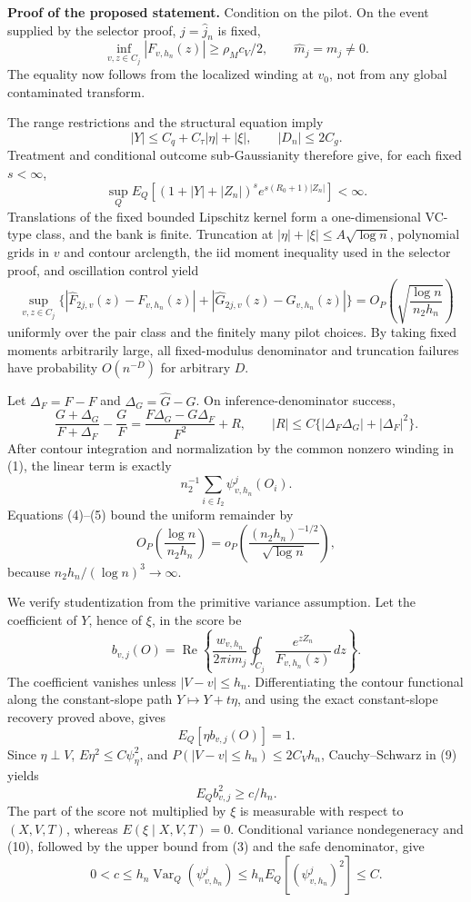 \textbf{Proof of the proposed statement.}
Condition on the pilot. On the event supplied by the selector proof, \(j=\widehat j_n\) is fixed,
\[
 \inf_{v,z\in C_j}|F_{v,h_n}(z)|\ge\rho_Mc_V/2,
 \qquad \widehat m_j=m_j\ne0. \tag{1}
\]
The equality now follows from the localized winding at \(v_0\), not from any global contaminated transform.

The range restrictions and the structural equation imply
\[
 |Y|\le C_q+C_\tau|\eta|+|\xi|,
 \qquad |D_n|\le2C_g. \tag{2}
\]
Treatment and conditional outcome sub-Gaussianity therefore give, for each fixed \(s<\infty\),
\[
 \sup_QE_Q[(1+|Y|+|Z_n|)^s
 e^{s(R_0+1)|Z_n|}]<\infty. \tag{3}
\]
Translations of the fixed bounded Lipschitz kernel form a one-dimensional VC-type class, and the bank is finite. Truncation at \(|\eta|+|\xi|\le A\sqrt{\log n}\), polynomial grids in \(v\) and contour arclength, the iid moment inequality used in the selector proof, and oscillation control yield
\[
 \sup_{v,z\in C_j}
 \{|\widehat F_{2j,v}(z)-F_{v,h_n}(z)|
 +|\widehat G_{2j,v}(z)-G_{v,h_n}(z)|\}
 =O_P\!\left(\sqrt{\frac{\log n}{n_2h_n}}\right) \tag{4}
\]
uniformly over the pair class and the finitely many pilot choices. By taking fixed moments arbitrarily large, all fixed-modulus denominator and truncation failures have probability \(O(n^{-D})\) for arbitrary \(D\).

Let \(\Delta_F=\widehat F-F\) and \(\Delta_G=\widehat G-G\). On inference-denominator success,
\[
 \frac{G+\Delta_G}{F+\Delta_F}-\frac GF
 =\frac{F\Delta_G-G\Delta_F}{F^2}+R,
 \qquad |R|\le C\{|\Delta_F\Delta_G|+|\Delta_F|^2\}. \tag{5}
\]
After contour integration and normalization by the common nonzero winding in (1), the linear term is exactly
\[
 n_2^{-1}\sum_{i\in I_2}\psi^j_{v,h_n}(O_i). \tag{6}
\]
Equations (4)--(5) bound the uniform remainder by
\[
 O_P\!\left(\frac{\log n}{n_2h_n}\right)
 =o_P\!\left(\frac{(n_2h_n)^{-1/2}}{\sqrt{\log n}}\right), \tag{7}
\]
because \(n_2h_n/(\log n)^3\to\infty\).

We verify studentization from the primitive variance assumption. Let the coefficient of \(Y\), hence of \(\xi\), in the score be
\[
 b_{v,j}(O)=\operatorname{Re}\left\{
 \frac{w_{v,h_n}}{2\pi i m_j}
 \oint_{C_j}\frac{e^{zZ_n}}{F_{v,h_n}(z)}\,dz\right\}. \tag{8}
\]
The coefficient vanishes unless \(|V-v|\le h_n\). Differentiating the contour functional along the constant-slope path \(Y\mapsto Y+t\eta\), and using the exact constant-slope recovery proved above, gives
\[
 E_Q[\eta b_{v,j}(O)]=1. \tag{9}
\]
Since \(\eta\perp V\), \(E\eta^2\le C\psi_\eta^2\), and \(P(|V-v|\le h_n)\le2C_Vh_n\), Cauchy--Schwarz in (9) yields
\[
 E_Qb_{v,j}^2\ge c/h_n. \tag{10}
\]
The part of the score not multiplied by \(\xi\) is measurable with respect to \((X,V,T)\), whereas \(E(\xi\mid X,V,T)=0\). Conditional variance nondegeneracy and (10), followed by the upper bound from (3) and the safe denominator, give
\[
 0<c\le h_n\operatorname{Var}_Q(\psi^j_{v,h_n})
 \le h_nE_Q[(\psi^j_{v,h_n})^2]\le C. \tag{11}
\]

